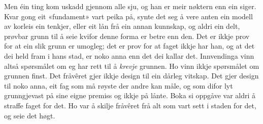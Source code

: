 Men éin ting kom uskadd gjennom alle sju, og han er meir nøktern enn ein siger. Kvar gong eit «fundament» vart peika på, synte det seg å vere anten ein modell av korleis ein tenkjer, eller eit lån frå ein annan kunnskap, og aldri ein delt, prøvbar grunn til å seie kvifor denne forma er betre enn den. Det er ikkje prov for at ein slik grunn er umogleg; det er prov for at faget ikkje har han, og at det dei held fram i hans stad, er noko anna enn det dei kallar det. Innvendinga vinn altså spørsmålet om eg har rett til å \emph{krevje} grunnen. Ho vinn ikkje spørsmålet om grunnen finst. Det fråvêret gjer ikkje design til ein dårleg vitskap. Det gjer design til noko anna, eit fag som må røyste der andre kan måle, og som difor lyt grunngjevast på sine eigne premiss og ikkje på lånte. Boka si oppgåve var aldri å straffe faget for det. Ho var å skilje fråvêret frå alt som vart sett i staden for det, og seie det høgt.



